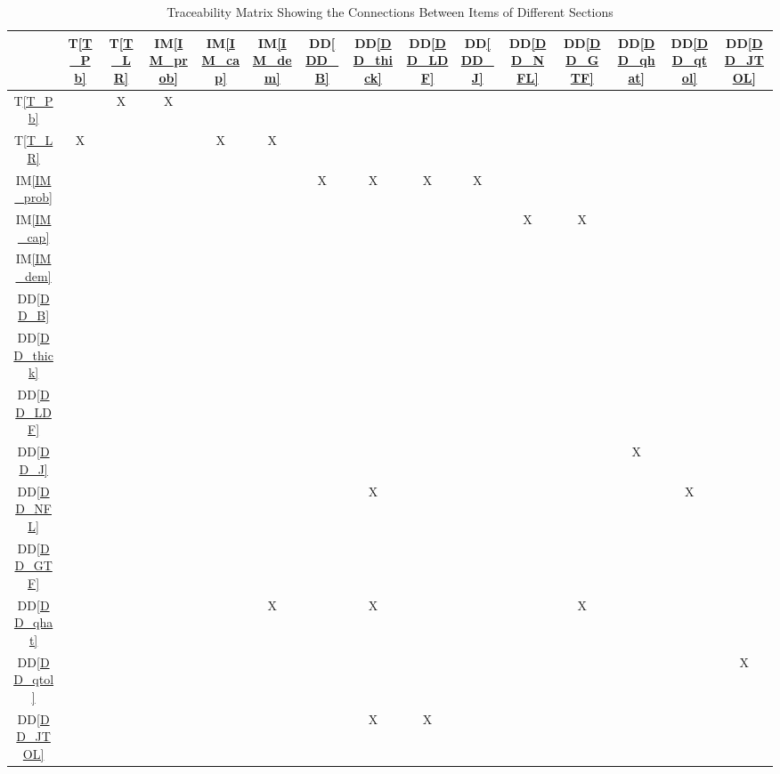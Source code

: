 \documentclass[12pt]{article}
\newcommand{\ddref}[1]{DD\ref{#1}}
\newcommand{\tref}[1]{T\ref{#1}}
\newcommand{\iref}[1]{IM\ref{#1}}
\begin{document}
\begin{table}[h!]
\centering
\begin{tabular}{|c|c|c|c|c|c|c|c|c|c|c|c|c|c|c|}
\hline        
	& \tref{T_Pb} & \tref{T_LR} & \iref{IM_prob} & \iref{IM_cap}& \iref{IM_dem} & 
	\ddref{DD_B} & \ddref{DD_thick} & \ddref{DD_LDF} & \ddref{DD_J} & \ddref{DD_NFL} & 
	\ddref{DD_GTF} & \ddref{DD_qhat} & \ddref{DD_qtol} & \ddref{DD_JTOL} \\
\hline
\tref{T_Pb}           & & X & X & & & & & & & & & & & \\ \hline
\tref{T_LR}             & X & & & X & X & & & & & & & & & \\ \hline
\iref{IM_prob}      & & & & & & X & X & X & X & & & & & \\ \hline
\iref{IM_cap}        & & & & & & & & & & X & X & & & \\ \hline
\iref{IM_dem}       & & & & & & & & & & & & & & \\ \hline
\ddref{DD_B}       & & & & & & & & & & & & & & \\ \hline
\ddref{DD_thick}  & & & & & & & & & & & & & & \\ \hline
\ddref{DD_LDF}   & & & & & & & & & & & & & & \\ \hline
\ddref{DD_J}        & & & & & & & & & & & & X & & \\ \hline
\ddref{DD_NFL}   & & & & & & & X & & & & & & X & \\ \hline
\ddref{DD_GTF}   & & & & & & & & & & & & & & \\ \hline
\ddref{DD_qhat}   & & & & & X & & X & & & & X & & & \\ \hline
\ddref{DD_qtol}    & & & & & & & & & & & & & & X \\ \hline
\ddref{DD_JTOL} & & & & & & & X & X & & & & & & \\
\hline
\end{tabular}
\caption{Traceability Matrix Showing the Connections Between Items of Different Sections}
\label{Table:trace}
\end{table}

\newpage
\end{document}
